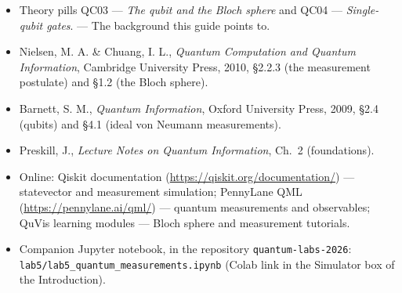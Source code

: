 \documentclass[a4paper,11pt]{article}
\begin{document}
\begin{itemize}
    \item Theory pills QC03 --- \textit{The qubit and the Bloch sphere} and QC04 ---
          \textit{Single-qubit gates}. --- The background this guide points to.
    \item Nielsen, M. A. \& Chuang, I. L., \textit{Quantum Computation and Quantum
          Information}, Cambridge University Press, 2010, \S 2.2.3 (the measurement
          postulate) and \S 1.2 (the Bloch sphere).
    \item Barnett, S. M., \textit{Quantum Information}, Oxford University Press, 2009,
          \S 2.4 (qubits) and \S 4.1 (ideal von Neumann measurements).
    \item Preskill, J., \textit{Lecture Notes on Quantum Information}, Ch.~2
          (foundations).
    \item Online: Qiskit documentation (\url{https://qiskit.org/documentation/}) --- statevector
          and measurement simulation; PennyLane QML (\url{https://pennylane.ai/qml/}) --- quantum
          measurements and observables; QuVis learning modules --- Bloch sphere and measurement
          tutorials.
    \item Companion Jupyter notebook, in the repository \texttt{quantum-labs-2026}:\\
          \texttt{lab5/lab5\_quantum\_measurements.ipynb} (Colab link in the Simulator box of
          the Introduction).
\end{itemize}
\end{document}
